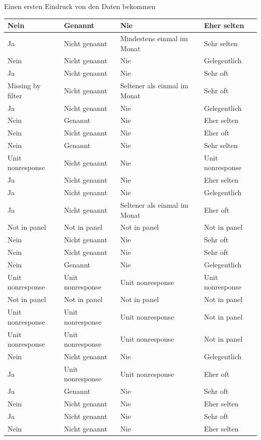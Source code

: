 \documentclass[ignorenonframetext,]{beamer}
\begin{document}
\begin{frame}{Einen ersten Eindruck von den Daten bekommen}
\begin{tabular}{l|l|l|l}
\hline
Nein & Genannt & Nie & Eher selten\\
\hline
Ja & Nicht genannt & Mindestens einmal im Monat & Sehr selten\\
\hline
Nein & Nicht genannt & Nie & Gelegentlich\\
\hline
Ja & Nicht genannt & Nie & Sehr oft\\
\hline
Missing by filter & Nicht genannt & Seltener als einmal im Monat & Sehr oft\\
\hline
Ja & Nicht genannt & Nie & Gelegentlich\\
\hline
Nein & Genannt & Nie & Eher selten\\
\hline
Nein & Nicht genannt & Nie & Eher oft\\
\hline
Nein & Genannt & Nie & Sehr selten\\
\hline
Unit nonresponse & Nicht genannt & Nie & Unit nonresponse\\
\hline
Ja & Nicht genannt & Nie & Eher selten\\
\hline
Ja & Nicht genannt & Nie & Gelegentlich\\
\hline
Ja & Nicht genannt & Seltener als einmal im Monat & Eher oft\\
\hline
Not in panel & Not in panel & Not in panel & Not in panel\\
\hline
Nein & Nicht genannt & Nie & Sehr oft\\
\hline
Nein & Nicht genannt & Nie & Sehr oft\\
\hline
Nein & Genannt & Nie & Gelegentlich\\
\hline
Unit nonresponse & Unit nonresponse & Unit nonresponse & Unit nonresponse\\
\hline
Not in panel & Not in panel & Not in panel & Not in panel\\
\hline
Unit nonresponse & Unit nonresponse & Unit nonresponse & Not in panel\\
\hline
Unit nonresponse & Unit nonresponse & Unit nonresponse & Not in panel\\
\hline
Nein & Nicht genannt & Nie & Gelegentlich\\
\hline
Ja & Unit nonresponse & Unit nonresponse & Eher oft\\
\hline
Ja & Genannt & Nie & Sehr oft\\
\hline
Nein & Nicht genannt & Nie & Eher selten\\
\hline
Ja & Nicht genannt & Nie & Sehr oft\\
\hline
Nein & Nicht genannt & Nie & Eher selten\\

\end{tabular}
\end{frame}
\end{document}
